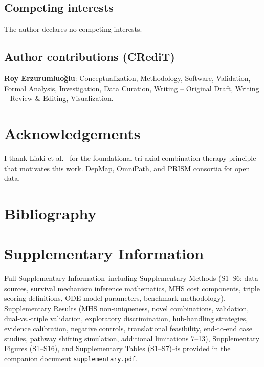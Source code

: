 \documentclass[times, twoside, watermark]{zHenriquesLab-StyleBioRxiv}
\newenvironment{acknowledgements}{\section*{Acknowledgements}}{}
\begin{document}
\subsection*{Competing interests}
The author declares no competing interests.

\subsection*{Author contributions (CRediT)}
\textbf{Roy Erzurumluoğlu}: Conceptualization, Methodology, Software, Validation, Formal Analysis, Investigation, Data Curation, Writing -- Original Draft, Writing -- Review \& Editing, Visualization.

\begin{acknowledgements}
I thank Liaki et al.~\cite{Liaki2025} for the foundational tri-axial combination therapy principle that motivates this work. DepMap, OmniPath, and PRISM consortia for open data.
\end{acknowledgements}

\section*{Bibliography}

\section*{Supplementary Information}
Full Supplementary Information--including Supplementary Methods (S1--S6: data sources, survival mechanism inference mathematics, MHS cost components, triple scoring definitions, ODE model parameters, benchmark methodology), Supplementary Results (MHS non-uniqueness, novel combinations, validation, dual-vs.-triple validation, exploratory discrimination, hub-handling strategies, evidence calibration, negative controls, translational feasibility, end-to-end case studies, pathway shifting simulation, additional limitations 7--13), Supplementary Figures (S1--S16), and Supplementary Tables (S1--S7)--is provided in the companion document \texttt{supplementary.pdf}.
\end{document}
